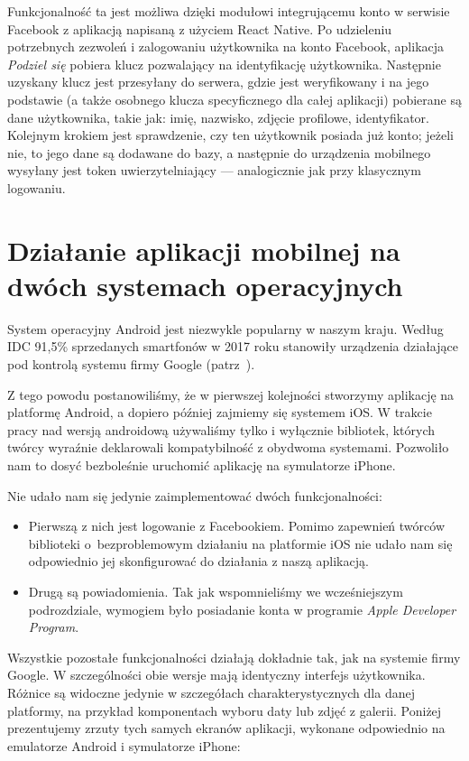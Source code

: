 \documentclass[licencjacka]{pracamgr}
\begin{document}
Funkcjonalność ta jest możliwa dzięki modułowi integrującemu konto w serwisie Facebook z aplikacją napisaną z użyciem React Native. Po udzieleniu potrzebnych zezwoleń i zalogowaniu użytkownika na konto Facebook, aplikacja \textit{Podziel się} pobiera klucz pozwalający na identyfikację użytkownika. Następnie uzyskany klucz jest przesyłany do serwera, gdzie jest weryfikowany i na jego podstawie (a także osobnego klucza specyficznego dla całej aplikacji) pobierane są dane użytkownika, takie jak: imię, nazwisko, zdjęcie profilowe, identyfikator. Kolejnym krokiem jest sprawdzenie, czy ten użytkownik posiada już konto; jeżeli nie, to jego dane są dodawane do bazy, a następnie do urządzenia mobilnego wysyłany jest token uwierzytelniający --- analogicznie jak przy klasycznym logowaniu.

\section{Działanie aplikacji mobilnej na dwóch systemach operacyjnych}

System operacyjny Android jest niezwykle popularny w naszym kraju. Według IDC 91,5\% sprzedanych smartfonów w 2017 roku stanowiły urządzenia działające pod kontrolą systemu firmy Google (patrz~\cite{popularnoscAndroid}).

Z tego powodu postanowiliśmy, że w pierwszej kolejności stworzymy aplikację na platformę Android, a dopiero później zajmiemy się systemem iOS\@. W trakcie pracy nad wersją androidową używaliśmy tylko i wyłącznie bibliotek, których twórcy wyraźnie deklarowali kompatybilność z obydwoma systemami. Pozwoliło nam to dosyć bezboleśnie uruchomić aplikację na symulatorze iPhone.

Nie udało nam się jedynie zaimplementować dwóch funkcjonalności:
\begin{itemize}
\item Pierwszą z nich jest logowanie z Facebookiem. Pomimo zapewnień twórców biblioteki o~bezproblemowym działaniu na platformie iOS nie udało nam się odpowiednio jej skonfigurować do działania z naszą aplikacją.
\item Drugą są powiadomienia. Tak jak wspomnieliśmy we wcześniejszym podrozdziale, wymogiem było posiadanie konta w programie \textit{Apple Developer Program}.
\end{itemize}
Wszystkie pozostałe funkcjonalności działają dokładnie tak, jak na systemie firmy Google. W szczególności obie wersje mają identyczny interfejs użytkownika. Różnice są widoczne jedynie w szczegółach charakterystycznych dla danej platformy, na przykład komponentach wyboru daty lub zdjęć z galerii. Poniżej prezentujemy zrzuty tych samych ekranów aplikacji, wykonane odpowiednio na emulatorze Android i symulatorze iPhone:
\end{document}

